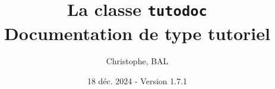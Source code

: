 \newcommand{\FTroot}{}
\def\FTroot{tmp.west}

\newcommand\contribtranslatedirtree{
  \begin{tikzpicture}%
    \draw[color=black, thick]
      \FTdirO(\FTroot,root,translate){
        \FTdirC(root,changes,changes){
        }
        \FTdirO(root,en,en) {
          \FTdirC(en,api,api) {
          }
          \FTdirC(en,doc,doc) {
          }
        }
        \FTdirC(root,fr,fr){
        }
        \FTdirC(root,status,status){
          \FTdirO(status,en,en) {
            \FTfile(en,api.yaml)
            \FTfile(en,manual.yaml)
          }
          \FTdirC(status,fr,fr){
          }
        }
        \FTfile(root,README.md)
        \FTfile(root,LICENCE.txt)
      };
  \end{tikzpicture}
}





\title{La classe \texttt{tutodoc} \\ Documentation de type tutoriel}
\author{Christophe, BAL}
\date{18 déc. 2024 - Version 1.7.1}

\maketitle

